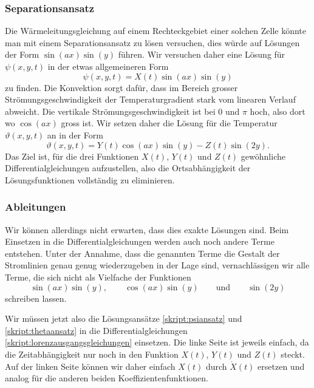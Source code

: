 \subsubsection{Separationsansatz}
Die Wärmeleitungsgleichung auf einem Rechteckgebiet 
einer solchen Zelle könnte man mit einem Separationsansatz zu lösen
versuchen, dies würde auf Lösungen der Form
$\sin(ax)\sin(y)$
führen.
Wir versuchen daher eine Lösung für $\psi(x,y,t)$ in der etwas
allgemeineren Form
\begin{equation}
\psi(x,y,t)
=
X(t) \sin(ax)\sin(y)
\label{skript:psiansatz}
\end{equation}
zu finden.
Die Konvektion sorgt dafür, dass im Bereich grosser
Strömungsgeschwindigkeit der Temperaturgradient stark vom linearen Verlauf
abweicht.
Die vertikale Strömungsgeschwindigkeit ist bei $0$ und $\pi$ hoch, also
dort wo $\cos(ax)$ gross ist.
Wir setzen daher die Lösung für die Temperatur $\vartheta(x,y,t)$ an in der
Form
\begin{equation}
\vartheta(x,y,t)
=
Y(t) \cos(ax) \sin(y) - Z(t) \sin(2y).
\label{skript:thetaansatz}
\end{equation}
Das Ziel ist, für die drei Funktionen $X(t)$, $Y(t)$ und $Z(t)$
gewöhnliche Differentialgleichungen aufzustellen, also die Ortsabhängigkeit
der Lösungsfunktionen vollständig zu eliminieren.

\subsubsection{Ableitungen}
Wir können allerdings nicht erwarten, dass dies exakte Lösungen sind.
Beim Einsetzen in die Differentialgleichungen werden auch noch
andere Terme entstehen.
Unter der Annahme, dass die genannten Terme die Gestalt der Stromlinien
genau genug wiederzugeben in der Lage sind, vernachlässigen wir alle
Terme, die sich nicht als Vielfache der Funktionen
\begin{equation}
\sin(ax)\sin(y),
\qquad
\cos(ax)\sin(y)
\qquad\text{und}\qquad
\sin(2y)
\label{skript:funktionsauswahl}
\end{equation}
schreiben lassen.

Wir müssen jetzt also die Lösungsansätze
\eqref{skript:psiansatz}
und
\eqref{skript:thetaansatz}
in die Differentialgleichungen
\eqref{skript:lorenzausgangsgleichungen}
einsetzen.
Die linke Seite ist jeweils einfach, da die Zeitabhängigkeit nur noch
in den Funktion $X(t)$, $Y(t)$ und $Z(t)$ steckt.
Auf der linken Seite können wir daher einfach $X(t)$ durch $\dot X(t)$
ersetzen und analog für die anderen beiden Koeffizientenfunktionen.

